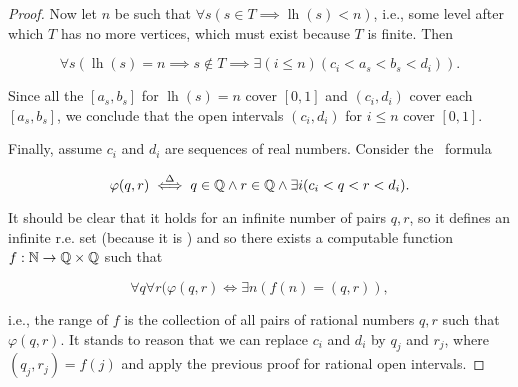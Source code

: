 \documentclass[../main.tex]{memoir}
\begin{document}
\begin{proof}
  Now let $n$ be such that $\forall s (s \in T \implies \operatorname{lh}(s) < n)$, i.e., some level after which $T$ has no more vertices, which must exist because $T$ is finite. Then

  \[ \forall s (\operatorname{lh}(s) = n \implies s \not\in T \implies \exists (i \le n) (c_i < a_s < b_s < d_i)). \]

  Since all the $[a_s, b_s]$ for $\operatorname{lh}(s) = n$ cover $[0, 1]$ and $(c_i, d_i)$ cover each $[a_s, b_s]$, we conclude that the open intervals $(c_i, d_i)$ for $i \le n$ cover $[0, 1]$.

  Finally, assume $c_i$ and $d_i$ are sequences of real numbers. Consider the \re\ formula

  \[ \varphi(q, r) \overset{\Delta}{\iff} q \in \mathbb{Q} \land r \in \mathbb{Q} \land \exists i (c_i < q < r < d_i). \]

  It should be clear that it holds for an infinite number of pairs $q, r$, so it defines an infinite r.e. set (because it is \re) and so there exists a computable function $f: \mathbb{N} \to \mathbb{Q} \times \mathbb{Q}$ such that

  \[ \forall q \forall r (\varphi(q, r) \iff \exists n (f(n) = (q, r)), \]

  i.e., the range of $f$ is the collection of all pairs of rational numbers $q, r$ such that $\varphi(q, r)$. It stands to reason that we can replace $c_i$ and $d_i$ by $q_j$ and $r_j$, where $(q_j, r_j) = f(j)$ and apply the previous proof for rational open intervals.
\end{proof}
\end{document}
